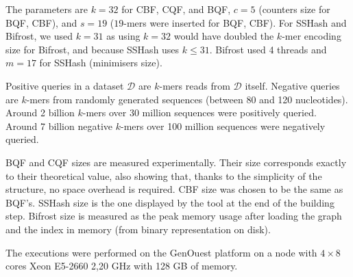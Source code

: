 The parameters are $k=32$ for CBF, CQF, and BQF, $c=5$ (counters size for BQF, CBF), and $s=19$ ($19$-mers were inserted for BQF, CBF). For SSHash and Bifrost, we used $k=31$ as using $k=32$ would have doubled the $k$-mer encoding size for Bifrost, and because SSHash uses $k\leq31$. 
Bifrost used 4 threads and $m=17$ for SSHash (minimisers size). 

Positive queries in a dataset $\mathcal{D}$ are $k$-mers reads from $\mathcal{D}$ itself. Negative queries are $k$-mers from randomly generated sequences (between 80 and 120 nucleotides). Around 2 billion $k$-mers over 30 million sequences were positively queried. Around 7 billion negative $k$-mers over 100 million sequences were negatively queried. 

BQF and CQF sizes are measured experimentally. Their size corresponds exactly to their theoretical value, also showing that, thanks to the simplicity of the structure, no space overhead is required. CBF size was chosen to be the same as BQF's. SSHash size is the one displayed by the tool at the end of the building step. Bifrost size is measured as the peak memory usage after loading the graph and the index in memory (from binary representation on disk). 

The executions were performed on the GenOuest platform on a node with $4 \times 8$ cores Xeon E5-2660 2,20 GHz with 128 GB of memory.
